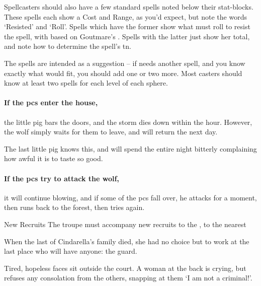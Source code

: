 \begin{multicols}{2}
Spellcasters should also have a few standard spells noted below their stat-blocks.
These spells each show a Cost and Range, as you'd expect, but note the words `Resisted' and `Roll'.
Spells which have the former show what  must roll to resist the spell, with  based on Goutmare's .
Spells with the latter just show her  total, and note how to determine the spell's \gls{tn}.

The spells are intended as a suggestion -- if  needs another spell, and you know exactly what would fit, you should add one or two more.
Most casters should know at least two spells for each level of each \gls{sphere}.

\showStdSpells

\paragraph{If the \glspl{pc} enter the house,}
the little pig bars the doors, and the storm dies down within the hour.
However, the wolf simply waits for them to leave, and will return the next day.

The last little pig knows this, and will spend the entire night bitterly complaining how awful it is to taste so good.

\paragraph{If the \glspl{pc} try to attack the wolf,}
it will continue blowing, and if some of the \glspl{pc} fall over, he attacks for a moment, then runs back to the forest, then tries again.


{New Recruits}%
{The troupe must accompany new recruits to the , to the nearest }%

\begin{exampletext}
  When the last of Cindarella's family died, she had no choice but to work at the last place who will have anyone: the \gls{guard}.
\end{exampletext}

\begin{boxtext}
  Tired, hopeless faces sit outside the \gls{court}.
  A woman at the back is crying, but refuses any consolation from the others, snapping at them `I am not a criminal!'.
\end{boxtext}


\end{multicols}

